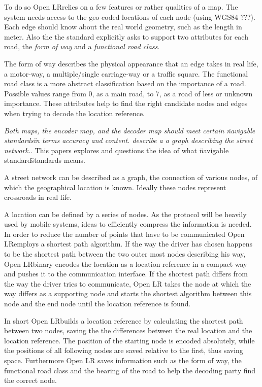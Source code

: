 To do so Open LR\tm relies on a few features or rather qualities of a map. The system needs access to the geo-coded locations of each node (using WGS84 ???). Each edge should know about the real world geometry, such as the length in meter. Also the the standard explicitly asks to support two attributes for each road, the \emph{form of way }and a \emph{functional road class}.

The form of way describes the physical appearance that an edge takes in real life, a motor-way, a multiple/single carriage-way or a traffic square. The functional road class is a more abstract classification based on the importance of a road. Possible values range from 0, as a main road, to 7, as a road of less or unknown importance. These attributes help to find the right candidate nodes and edges when trying to decode the location reference.

\emph{Both maps, the encoder map, and the decoder map should meet certain \"navigable standards\" in terms accuracy and content.  describe a a graph describing the street network.}. This papers explores and questions the idea of what \"navigable standard\" standards means.


A street network can be described as a graph, the connection of various nodes, of which the geographical location is known. Ideally these nodes represent crossroads in real life.

A location can be defined by a series of nodes. As the protocol will be heavily used by mobile systems, ideas to efficiently compress the information is needed. In order to reduce the number of points that have to be communicated Open LR\tm employs a shortest path algorithm. If the way the driver has chosen happens to be the shortest path between the two outer most nodes describing his way, Open LR\tm binary encodes the location as a location reference in a compact way and pushes it to the communication interface. If the shortest path differs from the way the driver tries to communicate, Open LR takes the node at which the way differs as a supporting node and starts the shortest algorithm between this node and the end node until the location reference is found.

In short Open LR\tm builds a location reference by calculating the shortest path between two nodes, saving the the differences between the real location and the location reference. The position of the  starting node is encoded absolutely, while the positions of all following nodes are saved relative to the first, thus saving space. Furthermore Open LR saves information such as the form of way, the functional road class and the bearing of the road to help the decoding party find the correct node.

